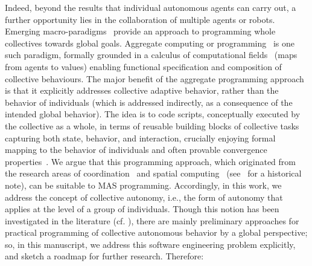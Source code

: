\documentclass[jsan,article,accept,moreauthors,pdftex]{Definitions/mdpi}
\newcommand{\revision}[1]{{\color{blue}{#1}}}
\begin{document}
Indeed, beyond the results that individual autonomous agents 
 can carry out, a further opportunity lies in the {collaboration}
 of multiple agents or robots.
%
Emerging {macro-paradigms}~\citep{DBLP:journals/corr/abs-1202-5509,viroli2019jlamp-si-coord}
 provide an approach to programming whole collectives
 towards global goals.
%
{Aggregate computing} or {programming}~\citep{DBLP:journals/computer/BealPV15,viroli2019jlamp-si-coord} is one such paradigm, formally grounded in a calculus of {computational fields}~\cite{audrito2019tocl} (maps from agents to values) enabling functional specification and composition of collective behaviours. %
%
The major benefit of the aggregate programming approach
 is that it explicitly addresses 
 collective adaptive behavior, rather than the behavior of individuals (which is addressed indirectly, as a consequence of the intended global behavior).
%
The idea is to code scripts, conceptually executed by the collective as a whole, in terms of reusable building blocks of collective tasks~\cite{DBLP:conf/saso/BealV14a}
 capturing both state, behavior, and interaction,
 crucially enjoying formal mapping to the behavior of individuals
 and often provable convergence properties~\cite{viroli2019jlamp-si-coord,DBLP:journals/tomacs/ViroliABDP18}.
%
We argue that this programming approach,
 which originated from the research areas of coordination~\cite{malone1994interdisciplinary} and spatial computing~\cite{DBLP:journals/corr/abs-1202-5509} (see~\cite{viroli2019jlamp-si-coord} for a historical note),
 can be suitable to MAS programming.
%
Accordingly, in this work, we address the concept of {collective autonomy}, i.e., the form of autonomy that applies at the level of a group of individuals.
%
Though this notion has been investigated in the literature (cf. ), there are mainly preliminary approaches for practical {programming} of collective autonomous behavior by a global perspective; so, in this manuscript, we address this software engineering problem explicitly, and sketch a roadmap for further research.
%
Therefore: %
\end{document}

